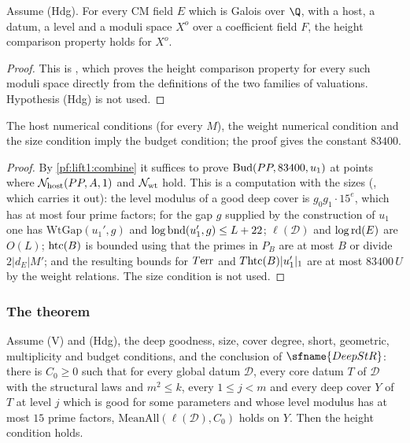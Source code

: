 \begin{lemma}\label{pf:lift1:htcmp}
Assume (Hdg). For every CM field $E$ which is Galois over $\Q$, with a host, a datum, a level and a
moduli space $X^o$ over a coefficient field $F$, the height comparison property holds for $X^o$.
\end{lemma}

\begin{proof}
This is , which proves the height comparison property for
every such moduli space directly from the definitions of the two families of valuations. Hypothesis
(Hdg) is not used.
\end{proof}

\begin{lemma}\label{pf:lift1:budget}
The host numerical conditions (for every $M$), the weight numerical condition and the size condition
imply the budget condition; the proof gives the constant $83400$.
\end{lemma}

\begin{proof}
By \cref{pf:lift1:combine} it suffices to prove $\mathrm{Bud}(PP,83400,u_1)$ at points where
$\mathcal N_{\mathrm{host}}(PP,A,1)$ and $\mathcal N_{\mathrm{wt}}$ hold. This is a computation with the sizes
(, which carries it out): the level modulus of a good
deep cover is $g_0g_1\cdot15^{e}$, which has at most four prime factors; for the gap $g$ supplied by the
construction of $u_1$ one has $\mathrm{WtGap}(u_1',g)$ and $\log\mathrm{bnd}(u_1',g)\le L+22$;
$\ell(\mathcal D)$ and $\log\mathrm{rd}(E)$ are $O(L)$; $\mathrm{htc}(B)$ is bounded using that the primes
in $P_B$ are at most $B$ or divide $2|d_E|M'$; and the resulting bounds for $T\mathrm{err}$ and
$T\mathrm{htc}(B)|u_1'|_1$ are at most $83400\,U$ by the weight relations. The size condition is not
used.
\end{proof}

\subsubsection*{The theorem}

\begin{proposition}\label{pf:lift1:meanall}
Assume (V) and (Hdg), the deep goodness, size, cover degree, short, geometric, multiplicity and budget
conditions, and the conclusion of $\sfname{DeepStR}$: there is $C_0\ge0$ such that for every global datum
$\mathcal D$, every core datum $T$ of $\mathcal D$ with the structural laws and $m^2\le k$, every
$1\le j<m$ and every deep cover $Y$ of $T$ at level $j$ which is good for some parameters and whose level
modulus has at most $15$ prime factors, $\mathrm{MeanAll}(\ell(\mathcal D),C_0)$ holds on $Y$. Then the
height condition holds.
\end{proposition}

